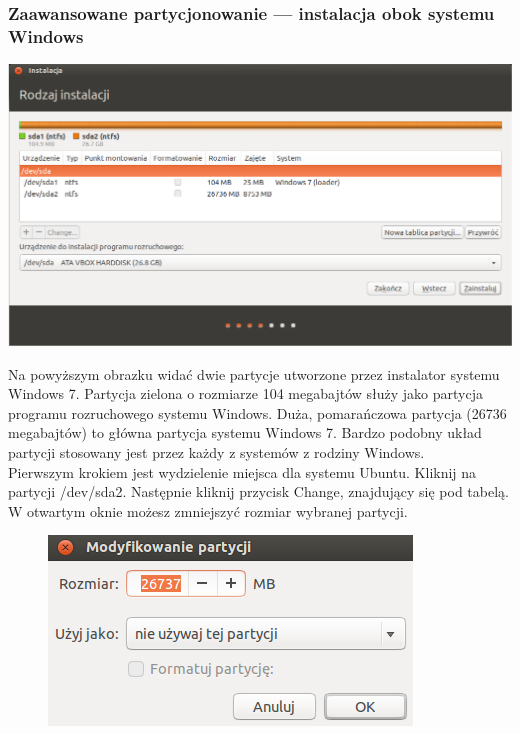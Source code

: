 \subsubsection{Zaawansowane partycjonowanie --- instalacja obok systemu Windows}
\begin{center}
	\includegraphics[width=\linewidth]{images/instalator_partycjonowanie_gparted2_czysty.png}
\end{center}

Na powyższym obrazku widać dwie partycje utworzone przez instalator systemu Windows 7. Partycja zielona o rozmiarze 104 megabajtów służy jako partycja programu rozruchowego systemu Windows. Duża, pomarańczowa partycja (26736 megabajtów) to główna partycja systemu Windows 7. Bardzo podobny układ partycji stosowany jest przez każdy z systemów z rodziny Windows.\\
Pierwszym krokiem jest wydzielenie miejsca dla systemu Ubuntu. Kliknij na partycji \textcolor{ubuntu_orange}{/dev/sda2}. Następnie kliknij przycisk \textcolor{ubuntu_orange}{Change}, znajdujący się pod tabelą. W otwartym oknie możesz zmniejszyć rozmiar wybranej partycji.

\begin{figure}
	\vspace{-10pt}
	\includegraphics[width=\linewidth]{images/instalator_partycjonowanie_gparted_zmniejszenie_partycji_windows.png}
\end{figure}

